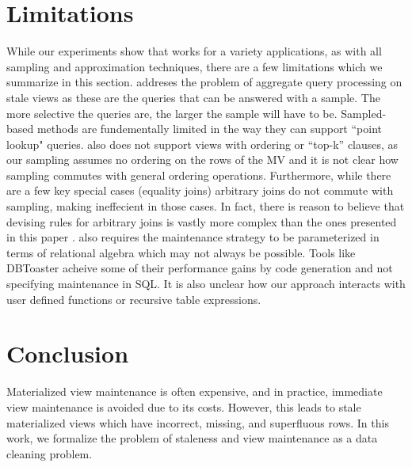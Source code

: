 \section{Limitations}\vspace{-.3em}\label{sec:disc}
While our experiments show that \svc works for a variety applications, as with all sampling and approximation techniques, there are a few limitations which we summarize in this section.
\svc addreses the problem of aggregate query processing on stale views as these are the queries that can be answered with a sample.
The more selective the queries are, the larger the sample will have to be.
Sampled-based methods are fundementally limited in the way they can support ``point lookup" queries.
\svc also does not support views with ordering or ``top-k'' clauses, as our sampling assumes no ordering on the rows of the MV and it is not clear how sampling commutes with general ordering operations.
Furthermore, while there are a few key special cases (equality joins) arbitrary joins do not commute with sampling, making \svc ineffecient in those cases.
In fact, there is reason to believe that devising rules for arbitrary joins is vastly more complex than the ones presented in this paper \cite{DBLP:journals/pvldb/NirkhiwaleDJ13}.
\svc also requires the maintenance strategy to be parameterized in terms of relational algebra which may not always be possible.
Tools like DBToaster acheive some of their performance gains by code generation and not specifying maintenance in SQL.
It is also unclear how our approach interacts with user defined functions or recursive table expressions.


\vspace{-1em}
\section{Conclusion}\label{conclusion}
\vspace{-.3em}
Materialized view maintenance is often expensive, and in practice, immediate view maintenance is avoided due to its costs.
However, this leads to stale materialized views which have incorrect, missing, and superfluous rows.
In this work, we formalize the problem of staleness and view maintenance as a data cleaning problem.

